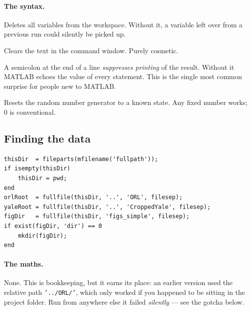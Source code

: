 \paragraph{The syntax.}
\begin{description}[leftmargin=*,style=nextline,nosep]
\item[\texttt{clear}] Deletes all variables from the workspace. Without it, a
  variable left over from a previous run could silently be picked up.
\item[\texttt{clc}] Clears the text in the command window. Purely cosmetic.
\item[\texttt{;}] A semicolon at the end of a line \emph{suppresses printing}
  of the result. Without it MATLAB echoes the value of every statement. This is
  the single most common surprise for people new to MATLAB.
\item[\texttt{rng(0)}] Resets the random number generator to a known state.
  Any fixed number works; $0$ is conventional.
\end{description}

\subsection{Finding the data}

\begin{lstlisting}
thisDir  = fileparts(mfilename('fullpath'));
if isempty(thisDir)
    thisDir = pwd;
end
orlRoot  = fullfile(thisDir, '..', 'ORL', filesep);
yaleRoot = fullfile(thisDir, '..', 'CroppedYale', filesep);
figDir   = fullfile(thisDir, 'figs_simple', filesep);
if exist(figDir, 'dir') == 0
    mkdir(figDir);
end
\end{lstlisting}

\paragraph{The maths.} None. This is bookkeeping, but it earns its place: an
earlier version used the relative path \texttt{'../ORL/'}, which only worked if
you happened to be sitting in the project folder. Run from anywhere else it
failed \emph{silently} --- see the gotcha below.


